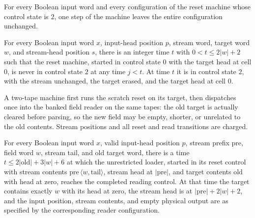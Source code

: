\begin{lemma}
\label{Complexity.clWipe_idle}
\leanok
{}
For every Boolean input word and every configuration of the reset machine whose control
state is $2$, one step of the machine leaves the entire configuration unchanged.
\end{lemma}

\begin{lemma}
\label{Complexity.clWipe_first}
\leanok
{}
For every Boolean input word $x$, input-head position $p$, stream word, target word $w$,
and stream-head position $s$, there is an integer time $t$ with $0<t\le 2|w|+2$ such
that the reset machine, started in control state $0$ with the target head at cell $0$,
is never in control state $2$ at any time $j<t$. At time $t$ it is in control state $2$,
with the stream unchanged, the target erased, and the target head at cell $0$.
\end{lemma}

\begin{definition}
\label{Complexity.clFreshTM}
\leanok
{}
A two-tape machine first runs the scratch reset on its target, then dispatches once into the banked field reader on the same tapes: the old target is actually cleared before parsing, so the new field may be empty, shorter, or unrelated to the old contents. Stream positions and all reset and read transitions are charged.
\end{definition}

\begin{lemma}
\label{Complexity.clFresh_run}
\leanok
{}
For every Boolean input word $x$, valid input-head position $p$, stream prefix
$\mathrm{pre}$, field word $w$, stream tail, and old target word, there is a time $t\le
2|\mathrm{old}|+3|w|+6$ at which the unrestricted loader, started in its reset control
with stream contents $\mathrm{pre}\,\langle w,\mathrm{tail}\rangle$, stream head at
$|\mathrm{pre}|$, and target contents $\mathrm{old}$ with head at zero, reaches the
completed reading control. At that time the target contains exactly $w$ with its head at
zero, the stream head is at $|\mathrm{pre}|+2|w|+2$, and the input position, stream
contents, and empty physical output are as specified by the corresponding reader
configuration.
\end{lemma}

